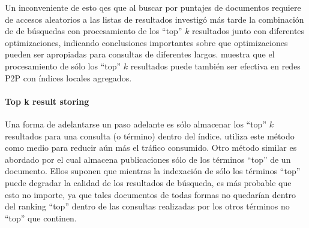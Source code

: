 Un inconveniente de esto qes que al buscar por puntajes de documentos requiere
de accesos aleatorios a las listas de resultados %
investigó más tarde la combinación de de búsquedas con procesamiento de los
``top'' $k$ resultados junto con diferentes optimizaciones, indicando
conclusiones importantes sobre que optimizaciones pueden ser apropiadas para
consultas de diferentes largos.
muestra que el procesamiento de sólo los ``top'' $k$ resultados puede también
ser efectiva en redes P2P con índices locales agregados.


\paragraph{Top k result storing} %
Una forma de adelantarse un paso adelante es sólo almacenar los ``top'' $k$
resultados para una consulta (o término) dentro del índice.
utiliza este método como medio para reducir aún más el tráfico consumido.
Otro método similar es abordado por %
el cual almacena publicaciones sólo de los términos ``top'' de un documento.
Ellos suponen que mientras la indexación de sólo los términos ``top'' puede
degradar la calidad de los resultados de búsqueda, es más probable que esto no
importe, ya que tales documentos de todas formas no quedarían dentro del ranking ``top''
dentro de las consultas realizadas por los otros términos no ``top'' que continen.
